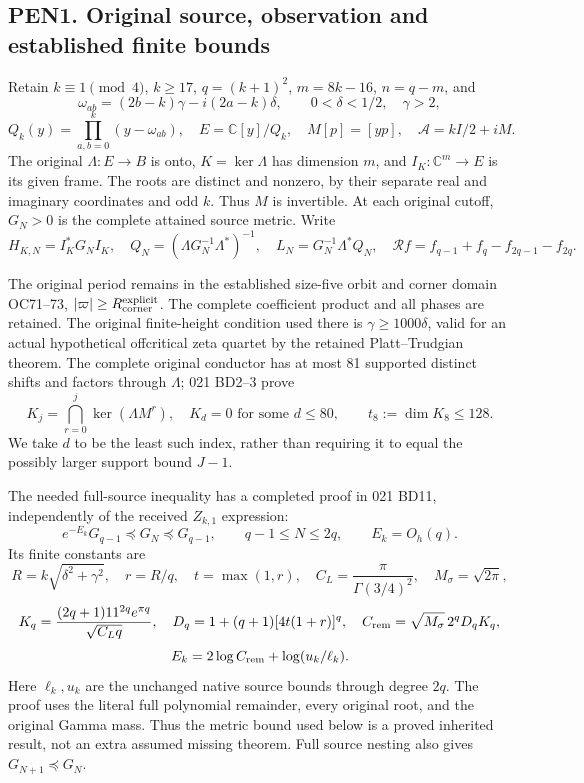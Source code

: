 \documentclass[11pt]{article}
\begin{document}
\subsection{PEN1. Original source, observation and established finite bounds}\label{pen1.-original-source-observation-and-established-finite-bounds}

Retain \(k\equiv1\pmod4\), \(k\ge17\), \(q=(k+1)^2\), \(m=8k-16\), \(n=q-m\), and \[
\omega_{ab}=(2b-k)\gamma-i(2a-k)\delta,\qquad
0<\delta<1/2,\quad\gamma>2,
\] \[
Q_k(y)=\prod_{a,b=0}^k(y-\omega_{ab}),\quad
E=\mathbb C[y]/Q_k,\quad M[p]=[yp],\quad
\mathscr A=kI/2+iM.
\] The original \(\Lambda:E\to B\) is onto, \(K=\ker\Lambda\) has dimension \(m\), and \(I_K:\mathbb C^m\to E\) is its given frame. The roots are distinct and nonzero, by their separate real and imaginary coordinates and odd \(k\). Thus \(M\) is invertible. At each original cutoff, \(G_N>0\) is the complete attained source metric. Write \[
H_{K,N}=I_K^*G_NI_K,\quad
Q_N=(\Lambda G_N^{-1}\Lambda^*)^{-1},\quad
L_N=G_N^{-1}\Lambda^*Q_N,\quad
\mathcal R f=f_{q-1}+f_q-f_{2q-1}-f_{2q}.
\]

The original period remains in the established size-five orbit and corner domain OC71--73, \(|\varpi|\ge R_{\rm corner}^{\rm explicit}\). The complete coefficient product and all phases are retained. The original finite-height condition used there is \(\gamma\ge1000\delta\), valid for an actual hypothetical offcritical zeta quartet by the retained Platt--Trudgian theorem. The complete original conductor has at most 81 supported distinct shifts and factors through \(\Lambda\); 021 BD2--3 prove \[
K_j=\bigcap_{r=0}^j\ker(\Lambda M^r),\quad
K_d=0\text{ for some }d\le80,\qquad t_8:=\dim K_8\le128. \tag{PEN1}
\] We take \(d\) to be the least such index, rather than requiring it to equal the possibly larger support bound \(J-1\).

The needed full-source inequality has a completed proof in 021 BD11, independently of the received \(Z_{k,1}\) expression: \[
e^{-E_k}G_{q-1}\preceq G_N\preceq G_{q-1},\qquad q-1\le N\le2q,\qquad E_k=O_h(q). \tag{PEN2}
\] Its finite constants are \[
R=k\sqrt{\delta^2+\gamma^2},\quad r=R/q,\quad t=\max(1,r),\quad
C_L=\frac{\pi}{\Gamma(3/4)^2},\quad M_\sigma=\sqrt{2\pi},
\] \[
K_q=\frac{(2q+1)11^{2q}e^{\pi q}}{\sqrt{C_Lq}},\quad
D_q=1+(q+1)[4t(1+r)]^q,\quad
C_{\rm rem}=\sqrt{M_\sigma}\,2^qD_qK_q,
\] \[
E_k=2\log C_{\rm rem}+\log(u_k/\ell_k).
\] Here \(\ell_k,u_k\) are the unchanged native source bounds through degree \(2q\). The proof uses the literal full polynomial remainder, every original root, and the original Gamma mass. Thus the metric bound used below is a proved inherited result, not an extra assumed missing theorem. Full source nesting also gives \(G_{N+1}\preceq G_N\).
\end{document}
